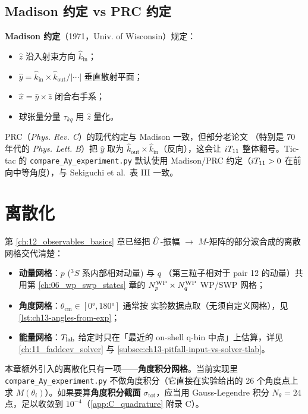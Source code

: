 \subsection{Madison 约定 vs PRC 约定}
\label{subsec:ch13-Madison-vs-PRC}

\textbf{Madison 约定}（1971，Univ. of Wisconsin）规定：
\begin{itemize}
  \item \(\hat{z}\) 沿入射束方向 \(\hat{k}_{\text{in}}\)；
  \item \(\hat{y} = \hat{k}_{\text{in}}\times \hat{k}_{\text{out}} / |\cdots|\)
        垂直散射平面；
  \item \(\hat{x} = \hat{y}\times \hat{z}\) 闭合右手系；
  \item 球张量分量 \(\tau_{kq}\) 用 \(\hat{z}\) 量化。
\end{itemize}
PRC（\textit{Phys. Rev. C}）的现代约定与 Madison 一致，但部分老论文
（特别是 70 年代的 \textit{Phys. Lett. B}）把 \(\hat{y}\) 取为
\(\hat{k}_{\text{out}}\times \hat{k}_{\text{in}}\)（反向），这会让
\({i T_{11}}\) 整体翻号。Tic-tac 的 \texttt{compare\_Ay\_experiment.py}
默认使用 Madison/PRC 约定（\({i T_{11}} > 0\) 在前向中等角度），与
Sekiguchi et al.\ 表 III 一致。

\section{离散化}
\label{sec:ch13-discretization}

第 \ref{ch:12_observables_basics} 章已经把
\(\hat{U}\)-振幅 \(\to\) \(M\)-矩阵的部分波合成的离散网格交代清楚：

\begin{itemize}
  \item \textbf{动量网格}：\(p\) (\({}^3\!S\) 系内部相对动量) 与 \(q\)
        （第三粒子相对于 pair 12 的动量）共用第 \ref{ch:06_wp_swp_states}
        章的 \({N_{p}^{\text{WP}}} \times {N_{q}^{\text{WP}}}\) WP/SWP 网格；
  \item \textbf{角度网格}：\(\theta_{\text{cm}} \in [0°, 180°]\) 通常按
        实验数据点取（无须自定义网格），见
        \cref{lst:ch13-angles-from-exp}；
  \item \textbf{能量网格}：\({T_{\text{lab}}}\) 给定时只在「最近的 on-shell q-bin
        中点」上估算，详见
        \cref{ch:11_faddeev_solver} 与
        \cref{subsec:ch13-pitfall-input-vs-solver-tlab}。
\end{itemize}

本章额外引入的离散化只有一项——\textbf{角度积分网格}。当前实现里
\texttt{compare\_Ay\_experiment.py} 不做角度积分（它直接在实验给出的 26
个角度点上求 \(M(\theta_i)\)）。如果要算\textbf{角度积分截面}
\(\sigma_{\text{tot}}\)，应当用 Gauss-Legendre 积分 \(N_\theta = 24\)
点，足以收敛到 \(10^{-4}\)（\cref{app:C_quadrature} 附录 C）。

